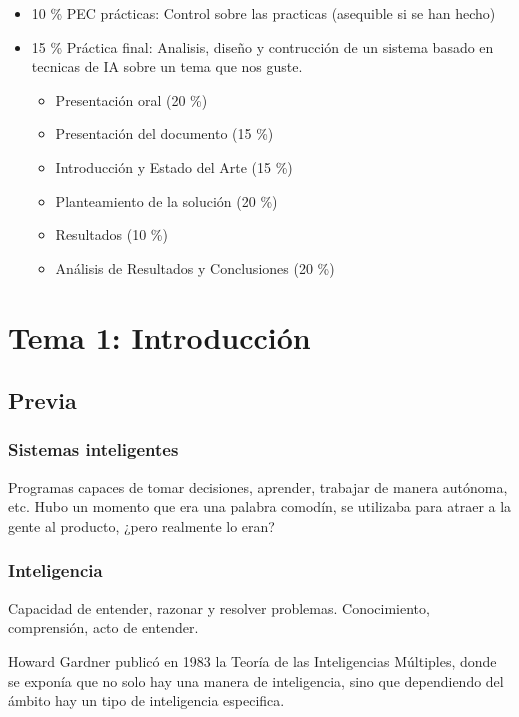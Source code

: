 \documentclass[12pt, twoside, openright]{report} %
\begin{document}
\begin{itemize}
\begin{itemize}
\begin{itemize}
		            \end{itemize}
		      \item 10 \% PEC prácticas: Control sobre las practicas (asequible si se han hecho)
		      \item 15 \% Práctica final: Analisis, diseño y contrucción de un sistema basado en tecnicas de IA sobre un tema que nos guste.
		            \begin{itemize}
			            \item Presentación oral (20 \%)
			            \item Presentación del documento (15 \%)
			            \item Introducción y Estado del Arte (15 \%)
			            \item Planteamiento de la solución (20 \%)
			            \item Resultados (10 \%)
			            \item Análisis de Resultados y Conclusiones (20 \%)
		            \end{itemize}
	      \end{itemize}

\end{itemize}

\chapter{Tema 1: Introducción}
\section{Previa}
\subsection{Sistemas inteligentes}
Programas capaces de tomar decisiones, aprender, trabajar de manera autónoma, etc. Hubo un momento que era una palabra comodín, se utilizaba para atraer a la gente al producto, ¿pero realmente lo eran?

\subsection{Inteligencia}
Capacidad de entender, razonar y resolver problemas. Conocimiento, comprensión, acto de entender.

Howard Gardner publicó en 1983 la Teoría de las Inteligencias Múltiples, donde se exponía que no solo hay una manera de inteligencia, sino que dependiendo del ámbito hay un tipo de inteligencia especifica.
\begin{figure}[H]
	{\def\svgwidth{.8\textwidth}
		}
\end{figure}
\end{document}
